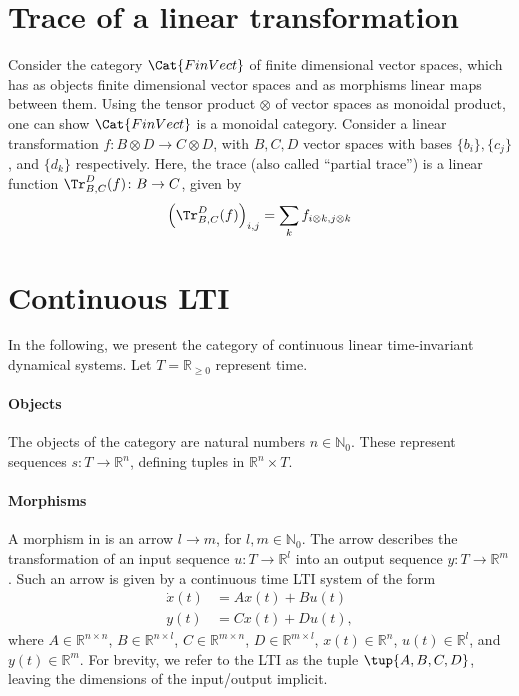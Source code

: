 
\section{Trace of a linear transformation}
Consider the category $\Cat{FinVect}$ of finite dimensional vector spaces, which has as objects finite dimensional vector spaces and as morphisms linear maps between them. Using the tensor product $\otimes$ of vector spaces as monoidal product, one can show $\Cat{FinVect}$ is a monoidal category. Consider a linear transformation $f\colon B\otimes D\to C\otimes D$, with $B,C,D$ vector spaces with bases $\{b_i\},\{c_j\}$, and $\{d_k\}$ respectively. Here, the trace (also called ``partial trace'') is a linear function $\Tr_{B,C}
^D(f)\colon B\to C$, given by
\begin{equation}
  \left(\Tr_{B,C}
  ^D(f) \right)_{i,j}=\sum_{k}f_{i\otimes k,j\otimes k}
\end{equation}

\section{Continuous LTI}
In the following, we present the category of continuous linear time-invariant dynamical systems. Let $T=\mathbb{R}_{\geq 0}$ represent time.

\paragraph{Objects} The objects of the category are natural numbers $n\in \mathbb{N}_0$. These represent sequences $s\colon T\to \mathbb{R}^n$, defining tuples in $\mathbb{R}^n\times T$.

\paragraph{Morphisms} A morphism in  is an arrow $l\to m$, for $l,m\in \mathbb{N}_0$. The arrow describes the transformation of an input sequence $u\colon T\to \mathbb{R}^l$ into an output sequence $y\colon T\to \mathbb{R}^m$. Such an arrow is given by a continuous time LTI system of the form
\begin{equation}
  \begin{aligned}
    \dot{x}(t)&=Ax(t)+Bu(t)\\
    y(t)&=Cx(t)+Du(t),
  \end{aligned}
\end{equation}
where $A\in \mathbb{R}^{n\times n}$, $B\in \mathbb{R}^{n\times l}$, $C\in \mathbb{R}^{m\times n}$, $D\in \mathbb{R}^{m\times l}$, $x(t)\in \mathbb{R}^n$, $u(t)\in \mathbb{R}^l$, and $y(t)\in \mathbb{R}^m$. For brevity, we refer to the LTI as the tuple $\tup{A,B,C,D}$, leaving the dimensions of the input/output implicit.

